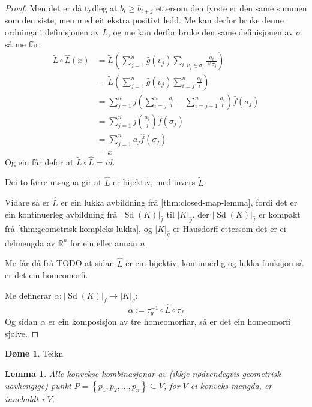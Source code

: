 \documentclass[a4paper, titlepage, 12pt, norsk]{article}
\theoremstyle{plain}
\newtheorem{lemma}[theorem]{Lemma}
\theoremstyle{definition}
\newtheorem{example}[theorem]{Døme}
\newcommand{\Rb}{\mathbb{R}}
\newcommand{\gr}[1]{ \lvert #1 \rvert } %
\newcommand{\set}[1]{ \left \{ #1 \right \} } %
\newcommand{\tuple}[1]{ \left( #1 \right) } %
\DeclareMathOperator{\Sd}{Sd}
\begin{document}
\begin{proof}
	Men det er då tydleg at \( b_i \geq b_{i+j} \) ettersom den fyrste er den same summen som den siste, men med eit ekstra positivt ledd. Me kan derfor bruke denne ordninga i definisjonen av \( \tilde{L} \), og me kan derfor bruke den same definisjonen av \( \sigma \), så me får:
	\begin{align*}
		\tilde{L}\circ\hat{L}(x) &= \tilde{L}\tuple{\sum_{j=1}^n \hat{g}(v_j) \sum_{i:v_j\in\sigma_i}\frac{a_i}{\#\sigma_i}} \\
		&= \tilde{L}\tuple{\sum_{j=1}^n \hat{g}(v_j) \sum_{i=j}^n \frac{a_i}{i}} \\
		&= \sum_{j=1}^n j\tuple{\sum_{i=j}^n \frac{a_i}{i} - \sum_{i=j+1}^n \frac{a_i}{i}}\hat{f}(\sigma_j) \\
		&= \sum_{j=1}^n j\tuple{\frac{a_j}{j}}\hat{f}(\sigma_j) \\
		&= \sum_{j=1}^n a_j \hat{f}(\sigma_j) \\
		&= x
	\end{align*}
	Og ein får defor at \( \tilde{L}\circ\hat{L} = id \). 
	
	Dei to førre utsagna gir at \( \hat{L} \) er bijektiv, med invers \( \tilde{L} \).

	Vidare så er \( \hat{L} \) er ein lukka avbildning frå \autoref{thm:closed-map-lemma}, fordi det er ein kontinuerleg avbildning frå \( \gr{\Sd(K)}_{\hat{f}} \) til \( \gr{K}_{\hat{g}} \), der \( \gr{\Sd(K)}_{\hat{f}} \) er kompakt frå \autoref{thm:geometrisk-kompleks-lukka}, og  \( \gr{K}_{\hat{g}} \) er Hausdorff ettersom det er ei delmengda av \( \Rb^n \) for ein eller annan \( n \).

	Me får då frå TODO at sidan \( \hat{L} \) er ein bijektiv, kontinuerlig og lukka funksjon så er det ein homeomorfi.

	Me definerar \( \alpha: \gr{\Sd(K)}_f \to \gr{K}_g \):
	\[
		\alpha := \tau_g^{-1} \circ \hat{L} \circ \tau_f
	\]
	Og sidan \( \alpha \) er ein komposisjon av tre homeomorfiar, så er det ein homeomorfi sjølve.
\end{proof}

\begin{example}
	Teikn
\end{example}

\begin{lemma} \label{thm:konveks-kombinasjon-i-konveks}
	Alle konvekse kombinasjonar av (ikkje nødvendegvis geometrisk uavhengige) punkt \( P = \set{p_1, p_2, \dots, p_n } \subseteq V \), for \( V \) ei konveks mengda, er innehaldt i \( V \).
\end{lemma}
\end{document}

